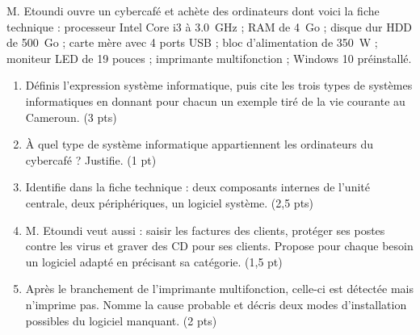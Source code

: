 \documentclass[11pt]{article}
\newcommand{\cle}[1]{{\popxbold\color{popdark}#1}}
\begin{document}
\begin{exercice}
M. Etoundi ouvre un cybercafé et achète des ordinateurs dont voici la fiche technique : processeur Intel Core i3 à \SI{3,0}{GHz} ; RAM de \SI{4}{Go} ; disque dur HDD de \SI{500}{Go} ; carte mère avec 4 ports USB ; bloc d'alimentation de \SI{350}{W} ; moniteur LED de 19 pouces ; imprimante multifonction ; Windows 10 préinstallé.
\begin{enumerate}
\item Définis l'expression \cle{système informatique}, puis cite les trois types de systèmes informatiques en donnant pour chacun un exemple tiré de la vie courante au Cameroun. \hfill (3 pts)
\item À quel type de système informatique appartiennent les ordinateurs du cybercafé ? Justifie. \hfill (1 pt)
\item Identifie dans la fiche technique : deux composants internes de l'unité centrale, deux périphériques, un logiciel système. \hfill (2,5 pts)
\item M. Etoundi veut aussi : saisir les factures des clients, protéger ses postes contre les virus et graver des CD pour ses clients. Propose pour chaque besoin un logiciel adapté en précisant sa catégorie. \hfill (1,5 pt)
\item Après le branchement de l'imprimante multifonction, celle-ci est détectée mais n'imprime pas. Nomme la cause probable et décris deux modes d'installation possibles du logiciel manquant. \hfill (2 pts)
\end{enumerate}
\end{exercice}
\end{document}

